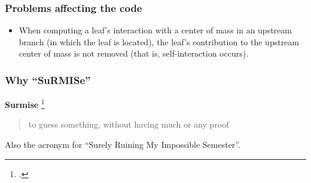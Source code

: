 \appendix

\begin{frame}
	\frametitle{Problems affecting the code}
	\begin{itemize}
		\item When computing a leaf's interaction with a center of mass in an upstream branch (in which the leaf is located), the leaf's contribution to the upstream center of mass is not removed (that is, self-interaction occurs).
	\end{itemize}
\end{frame}

\begin{frame}
\frametitle{Why ``SuRMISe''}
\textbf{Surmise} \footcite{surmise}
\begin{quote}
	to guess something, without having much or any proof
\end{quote}
\par
\vspace{1cm}
Also the acronym for ``\alert{Su}rely \alert{R}uining \alert{M}y \alert{I}mpossible \alert{Se}mester''.
\end{frame}
